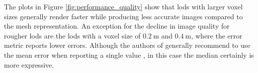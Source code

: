 The plots in Figure \ref{fig:performance_quality} show that \acsp{lod} with larger voxel sizes generally render faster while producing less accurate images compared to the mesh representation.
An exception for the decline in image quality for rougher \acsp{lod} are the \acsp{lod} with a voxel size of $\SI{0.2}{\m}$ and $\SI{0.4}{\m}$, where the \FLIP error metric reports lower errors.
Although the authors of \FLIP generally recommend to use the mean error when reporting a single value \cite{flip_rt_gems}, in this case the median certainly is more expressive.






